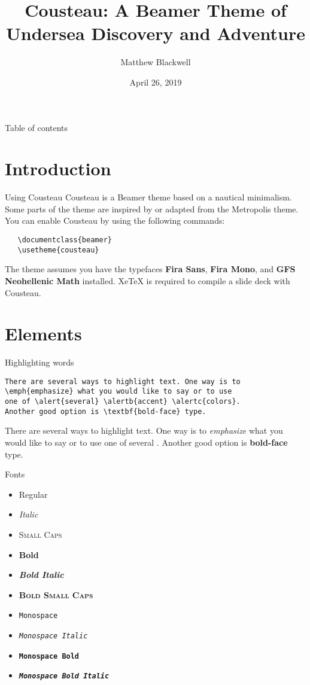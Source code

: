 \documentclass{beamer}
\title{Cousteau: A Beamer Theme of Undersea Discovery and Adventure}
\author{Matthew Blackwell}
\institute{Harvard University}
\date{April 26, 2019}
\begin{document}
\frame{\titlepage}


\begin{frame}{Table of contents}
  \tableofcontents
\end{frame}

\section{Introduction}

\begin{frame}[fragile]{Using Cousteau}
  Cousteau is a Beamer theme based on a nautical minimalism. Some parts of the theme are inspired by or adapted from the Metropolis theme. You can enable Cousteau by using the following commands:
\begin{verbatim}
   \documentclass{beamer}
   \usetheme{cousteau}
\end{verbatim}
  The theme assumes you have the typefaces \textbf{Fira Sans}, \textbf{Fira Mono}, and \textbf{GFS Neohellenic Math} installed. XeTeX is required to compile a slide deck with Cousteau.
\end{frame}


\section{Elements}

\begin{frame}[fragile]{Highlighting words}

\begin{verbatim}
There are several ways to highlight text. One way is to 
\emph{emphasize} what you would like to say or to use 
one of \alert{several} \alertb{accent} \alertc{colors}. 
Another good option is \textbf{bold-face} type. 
\end{verbatim}

  \bigskip
  
  There are several ways to highlight text. One way is to \emph{emphasize} what you would like to say or to use one of \alert{several}  . Another good option is \textbf{bold-face} type. 
  
\end{frame}

\begin{frame}{Fonts}
  \begin{itemize}
    \item Regular
    \item \textit{Italic}
    \item \textsc{Small Caps}
    \item \textbf{Bold}
    \item \textbf{\textit{Bold Italic}}
    \item \textbf{\textsc{Bold Small Caps}}
    \item \texttt{Monospace}
    \item \texttt{\textit{Monospace Italic}}
    \item \texttt{\textbf{Monospace Bold}}
    \item \texttt{\textbf{\textit{Monospace Bold Italic}}}
  \end{itemize}
  
\end{frame}
\end{document}
